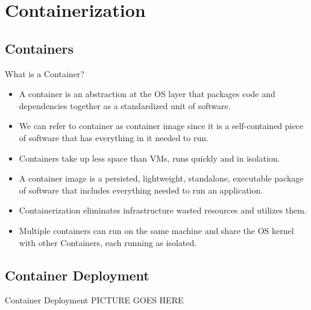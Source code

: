 

\section{Containerization}\label{sec:containerization}

\subsection{Containers}\label{subsec:containers}
\begin{frame}{What is a Container?}
    \begin{itemize}
        \item A container is an abstraction at the OS layer that packages code and dependencies together as a standardized unit of software.
        \item We can refer to container as container image since it is a self-contained piece of software that has everything in it needed to run.
        \item Containers take up less space than VMs, runs quickly and in isolation.
        \item A container image is a persisted, lightweight, standalone, executable package of software that includes everything needed to run an application.
        \item Containerization eliminates infrastructure wasted resources and utilizes them.
        \item Multiple containers can run on the same machine and share the OS kernel with other Containers, each running as isolated.
    \end{itemize}
\end{frame}

\subsection{Container Deployment}\label{subsec:container-deployment}
\begin{frame}{Container Deployment}
    PICTURE GOES HERE
\end{frame}

